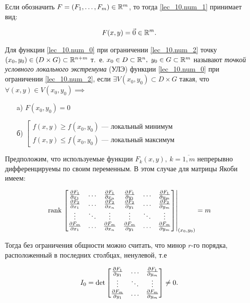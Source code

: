 \documentclass[../../main.tex]{subfiles}
\begin{document}
	Если обозначить $F = \left( F_1, \ldots, F_m \right) \in \mathbb{R}^m$, 
	то тогда \eqref{lec_10.num_1} принимает вид:
	
	\begin{equation} \label{lec_10.num_2}
		F(x, y) = \vec{0} \in \mathbb{R}^m.
	\end{equation}
	
	Для функции \eqref{lec_10.num_0} при ограничении \eqref{lec_10.num_2}
	точку $(x_0, y_0) \in \left( D \times G \right) 
	\subset \mathbb{R}^{n+m}$
	т.~е. $x_0 \in D \subset \mathbb{R}^n,$ $y_0 \in G \subset \mathbb{R}^m$ называют
	\emph{точкой условного локального экстремума} (УЛЭ) функции 
	\eqref{lec_10.num_0} при ограничении \eqref{lec_10.num_2}, если
	$\exists V( x_0, y_0 ) \subset D \times G $ такая, что 
	$\forall ( x, y) \in V( x_0, y_0) \implies $
	
	\begin{itemize}
		\item[a)] 
		$F(x_0, y_0) = 0$
		\item[б)]
		$\left[ \begin{gathered}
		f(x,y) \ge f(x_0, y_0)\text{~--- локальный минимум} \\
		f(x, y) \le f(x_0, y_0)\text{~--- локальный максимум} 
		\end{gathered} \right.$
	\end{itemize}
		
Предположим, что используемые функции $F_k(x,y),\ k = \overline{1, m}$ 
непрерывно дифференцируемы по своим переменным. В этом случае для 
матрицы Якоби имеем:

\begin{equation} \label{lec_10.num_3}
	\operatorname{rank} \left.\begin{bmatrix}
	\frac{\partial F_1}{\partial x_1} & \ldots & \frac{\partial F_1}{\partial x_n} & 
	\frac{\partial F_1}{\partial y_1} & \ldots & \frac{\partial F_1}{\partial y_m} \\
	\frac{\partial F_2}{\partial x_1} & \ldots & \frac{\partial F_2}{\partial x_n} &
	\frac{\partial F_2}{\partial y_1} & \ldots & \frac{\partial F_2}{\partial y_m} \\
	\vdots & \ddots & \vdots & \vdots & \ddots & \vdots \\
	\frac{\partial F_m}{\partial x_1} & \ldots & \frac{\partial F_m}{\partial x_n} &
	\frac{\partial F_m}{\partial y_1} & \ldots & \frac{\partial F_m}{\partial y_m}
	\end{bmatrix}
	\right|_{(x_0, y_0)} = m
\end{equation} 		
		
Тогда без ограничения общности можно считать, что минор
$r$-го порядка, расположенный в последних столбцах, ненулевой, т.е

\begin{equation} \label{lec_10.num_4}
	I_0 = \det \begin{bmatrix}
	\frac{\partial F_1}{\partial y_1} & \ldots & \frac{\partial F_1}{\partial y_m} \\
	\vdots & \ddots & \vdots \\
	\frac{\partial F_m}{\partial y_1} & \ldots & \frac{\partial F_m}{\partial y_m}
	\end{bmatrix} \ne 0.
\end{equation}
\end{document}
